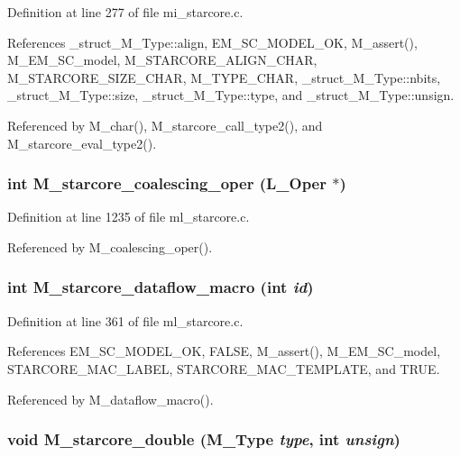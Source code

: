 Definition at line 277 of file mi\_\-starcore.c.

References \_\-struct\_\-M\_\-Type::align, EM\_\-SC\_\-MODEL\_\-OK, M\_\-assert(), M\_\-EM\_\-SC\_\-model, M\_\-STARCORE\_\-ALIGN\_\-CHAR, M\_\-STARCORE\_\-SIZE\_\-CHAR, M\_\-TYPE\_\-CHAR, \_\-struct\_\-M\_\-Type::nbits, \_\-struct\_\-M\_\-Type::size, \_\-struct\_\-M\_\-Type::type, and \_\-struct\_\-M\_\-Type::unsign.

Referenced by M\_\-char(), M\_\-starcore\_\-call\_\-type2(), and M\_\-starcore\_\-eval\_\-type2().
\subsubsection{\setlength{\rightskip}{0pt plus 5cm}int M\_\-starcore\_\-coalescing\_\-oper (L\_\-Oper $\ast$)}\label{m__starcore_8h_ce8569b0cade221192216aa9a98a49ab}




Definition at line 1235 of file ml\_\-starcore.c.

Referenced by M\_\-coalescing\_\-oper().
\subsubsection{\setlength{\rightskip}{0pt plus 5cm}int M\_\-starcore\_\-dataflow\_\-macro (int {\em id})}\label{m__starcore_8h_972aabcc8b107edc48c5e85e2b1d211e}




Definition at line 361 of file ml\_\-starcore.c.

References EM\_\-SC\_\-MODEL\_\-OK, FALSE, M\_\-assert(), M\_\-EM\_\-SC\_\-model, STARCORE\_\-MAC\_\-LABEL, STARCORE\_\-MAC\_\-TEMPLATE, and TRUE.

Referenced by M\_\-dataflow\_\-macro().
\subsubsection{\setlength{\rightskip}{0pt plus 5cm}void M\_\-starcore\_\-double (\bf{M\_\-Type} {\em type}, int {\em unsign})}\label{m__starcore_8h_1a4fed3007066bd3e9b1ff8dd2ff37fe}




